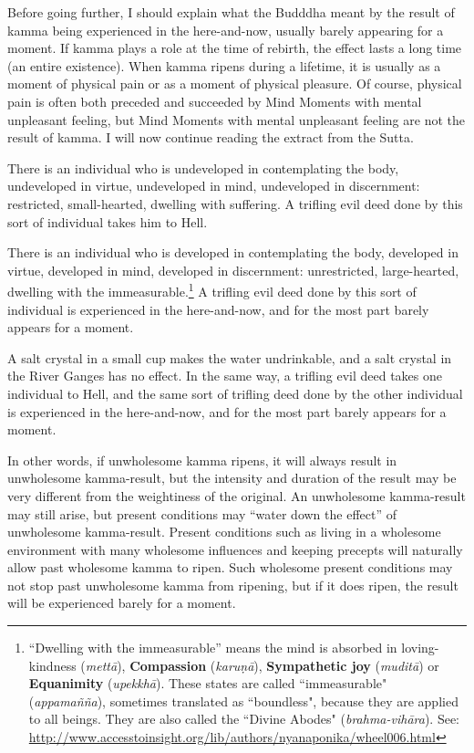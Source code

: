 Before going further, I should explain what the Budddha meant by the result of kamma being experienced in the here-and-now, usually barely appearing for a moment. If kamma plays a role at the time of rebirth, the effect lasts a long time (an entire existence). When kamma ripens during a lifetime, it is usually as a moment of physical pain or as a moment of physical pleasure. Of course, physical pain is often both preceded and succeeded by Mind Moments with mental unpleasant feeling, but Mind Moments with mental unpleasant feeling are not the result of kamma. I will now continue reading the extract from the Sutta.

There is an individual who is undeveloped in contemplating the body, undeveloped in virtue, undeveloped in mind, undeveloped in discernment: restricted, small-hearted, dwelling with suffering. A trifling evil deed done by this sort of individual takes him to Hell.

\pagebreak

There is an individual who is developed in contemplating the body, developed in virtue, developed in mind, developed in discernment: unrestricted, large-hearted, dwelling with the immeasurable.\footnote{“Dwelling with the immeasurable” means the mind is absorbed in loving-kindness (\textit{mettā}), \textbf{Compassion} (\textit{karuṇā}), \textbf{Sympathetic joy} (\textit{muditā}) or \textbf{Equanimity} (\textit{upekkhā}). These states are called ``immeasurable" (\textit{appamañña}), sometimes translated as ``boundless", because they are applied to all beings. They are also called the ``Divine Abodes" (\textit{brahma-vihāra}). See: \url{http://www.accesstoinsight.org/lib/authors/nyanaponika/wheel006.html}} A trifling evil deed done by this sort of individual is experienced in the here-and-now, and for the most part barely appears for a moment.

A salt crystal in a small cup makes the water undrinkable, and a salt crystal in the River Ganges has no effect. In the same way, a trifling evil deed takes one individual to Hell, and the same sort of trifling deed done by the other individual is experienced in the here-and-now, and for the most part barely appears for a moment.

In other words, if unwholesome kamma ripens, it will always result in unwholesome kamma-result, but the intensity and duration of the result may be very different from the weightiness of the original. An unwholesome kamma-result may still arise, but present conditions may “water down the effect” of unwholesome kamma-result. Present conditions such as living in a wholesome environment with many wholesome influences and keeping precepts will naturally allow past wholesome kamma to ripen. Such wholesome present conditions may not stop past unwholesome kamma from ripening, but if it does ripen, the result will be experienced barely for a moment.

